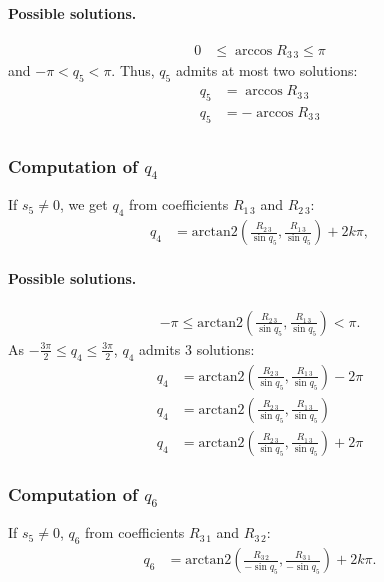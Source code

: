 \documentclass{article}
\begin{document}
\paragraph{Possible solutions.}

\begin{align*}
  0 &\leq \arccos R_{3\,3} \leq \pi
\end{align*}
and $-\pi < q_5 < \pi$. Thus, $q_5$ admits at most two solutions:
\begin{align*}
  q_5 &= \arccos R_{3\,3}\\
  q_5 &= -\arccos R_{3\,3}\\
\end{align*}

\subsubsection*{Computation of $q_4$}

If $s_5\not=0$, we get $q_4$ from  coefficients $R_{1\,3}$ and $R_{2\,3}$:
\begin{align*}
  q_4 &= \mbox{arctan2}(\frac{R_{2\,3}}{\sin q_5}, \frac{R_{1\,3}}{\sin q_5}) + 2k\pi,
\end{align*}

\paragraph{Possible solutions.}

\begin{align*}
  -\pi \leq \mbox{arctan2}(\frac{R_{2\,3}}{\sin q_5}, \frac{R_{1\,3}}{\sin q_5}) < \pi.
\end{align*}
As $-\frac{3\pi}{2} \leq q_4 \leq \frac{3\pi}{2}$, $q_4$ admits 3 solutions:
\begin{align*}
  q_4 &= \mbox{arctan2}(\frac{R_{2\,3}}{\sin q_5}, \frac{R_{1\,3}}{\sin q_5}) -2\pi \\
  q_4 &= \mbox{arctan2}(\frac{R_{2\,3}}{\sin q_5}, \frac{R_{1\,3}}{\sin q_5}) \\
  q_4 &= \mbox{arctan2}(\frac{R_{2\,3}}{\sin q_5}, \frac{R_{1\,3}}{\sin q_5}) + 2\pi
\end{align*}

\subsubsection*{Computation of $q_6$}

If $s_5\not=0$, $q_6$ from coefficients $R_{3\,1}$ and $R_{3\,2}$:
\begin{align*}
  q_6 &= \mbox{arctan2}(\frac{R_{3\,2}}{-\sin q_5}, \frac{R_{3\,1}}{-\sin q_5}) + 2k\pi.
\end{align*}
\end{document}
